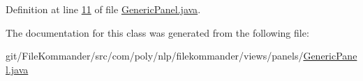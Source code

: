 Definition at line \hyperlink{L11}{11} of file \hyperlink{}{Generic\-Panel.\-java}.



The documentation for this class was generated from the following file\-:\begin{DoxyCompactItemize}
\item 
git/\-File\-Kommander/src/com/poly/nlp/filekommander/views/panels/\hyperlink{_generic_panel_8java}{Generic\-Panel.\-java}\end{DoxyCompactItemize}
